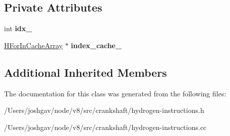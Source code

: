 \subsection*{Private Attributes}
\begin{DoxyCompactItemize}
\item 
int {\bfseries idx\+\_\+}\hypertarget{classv8_1_1internal_1_1_h_for_in_cache_array_ab12ced09969b7e469f3831fed6293083}{}\label{classv8_1_1internal_1_1_h_for_in_cache_array_ab12ced09969b7e469f3831fed6293083}

\item 
\hyperlink{classv8_1_1internal_1_1_h_for_in_cache_array}{H\+For\+In\+Cache\+Array} $\ast$ {\bfseries index\+\_\+cache\+\_\+}\hypertarget{classv8_1_1internal_1_1_h_for_in_cache_array_aa70bffe67a99bd07b0e49cb621a7b620}{}\label{classv8_1_1internal_1_1_h_for_in_cache_array_aa70bffe67a99bd07b0e49cb621a7b620}

\end{DoxyCompactItemize}
\subsection*{Additional Inherited Members}


The documentation for this class was generated from the following files\+:\begin{DoxyCompactItemize}
\item 
/\+Users/joshgav/node/v8/src/crankshaft/hydrogen-\/instructions.\+h\item 
/\+Users/joshgav/node/v8/src/crankshaft/hydrogen-\/instructions.\+cc\end{DoxyCompactItemize}
